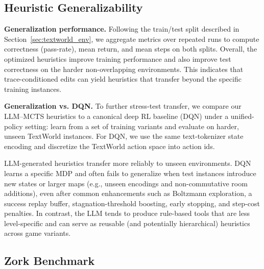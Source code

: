 \documentclass{article}
\begin{document}
\subsection{Heuristic Generalizability}

\textbf{Generalization performance.} Following the train/test split described in Section~\ref{sec:textworld_env}, we aggregate metrics over repeated runs to compute correctness (pass-rate), mean return, and mean steps on both splits. Overall, the optimized heuristics improve training performance and also improve test correctness on the harder non-overlapping environments. This indicates that trace-conditioned edits can yield heuristics that transfer beyond the specific training instances.

\textbf{Generalization vs. DQN.} To further stress-test transfer, we compare our LLM--MCTS heuristics to a canonical deep RL baseline (DQN) under a unified-policy setting: learn from a set of training variants and evaluate on harder, unseen TextWorld instances. For DQN, we use the same text-tokenizer state encoding and discretize the TextWorld action space into action ids.

LLM-generated heuristics transfer more reliably to unseen environments. DQN learns a specific MDP and often fails to generalize when test instances introduce new states or larger maps (e.g., unseen encodings and non-commutative room additions), even after common enhancements such as Boltzmann exploration, a success replay buffer, stagnation-threshold boosting, early stopping, and step-cost penalties. In contrast, the LLM tends to produce rule-based tools that are less level-specific and can serve as reusable (and potentially hierarchical) heuristics across game variants.


\subsection{Zork Benchmark}
\end{document}
